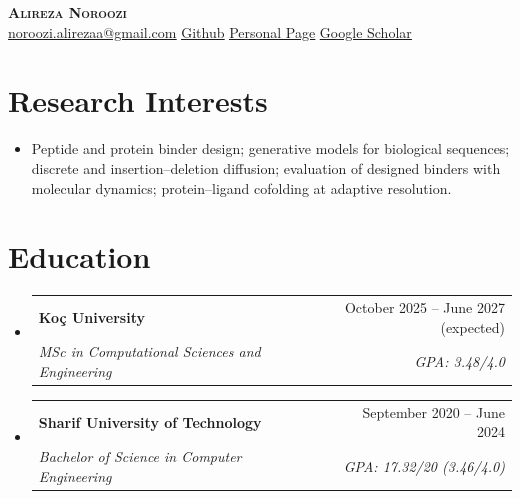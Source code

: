 \documentclass[letterpaper,11pt]{article}
\makeatletter
\newcommand{\resumeItem}[1]{\item\small{#1\vspace{-2pt}}}
\newcommand{\resumeSubheading}[4]{
  \vspace{-2pt}\item
    \begin{tabular*}{0.97\textwidth}[t]{l@{\extracolsep{\fill}}r}
      \textbf{#1} & #2 \\
      \textit{\small#3} & \textit{\small #4} \\
    \end{tabular*}\vspace{-7pt}
}
\newcommand{\resumeSubHeadingListStart}{\begin{itemize}[leftmargin=0.15in, label={}]}
\newcommand{\resumeSubHeadingListEnd}{\end{itemize}}
\newcommand{\resumeItemListStart}{\begin{itemize}}
\newcommand{\resumeItemListEnd}{\end{itemize}\vspace{-5pt}}
\makeatother
\begin{document}
\vspace*{12pt}
\begin{center}
    \textbf{\Huge \scshape Alireza Noroozi \\ \vspace{8pt}}
    \href{mailto:noroozi.alirezaa@gmail.com}{\underline{noroozi.alirezaa@gmail.com}}
    \href{https://github.com/Alirzeanoroozi}{\underline{Github}}
    \href{https://alirzeanoroozi.github.io/}{\underline{Personal Page}}
    \href{https://scholar.google.com/citations?user=CzouC0IAAAAJ\&hl=en}{\underline{Google Scholar}}
\end{center}

\section{Research Interests}
    \resumeItemListStart
        \resumeItem{Peptide and protein binder design; generative models for biological sequences; discrete and insertion--deletion diffusion; evaluation of designed binders with molecular dynamics; protein--ligand cofolding at adaptive resolution.}
    \resumeItemListEnd

\section{Education}
  \resumeSubHeadingListStart
    \resumeSubheading
      {Ko\c{c} University}{October 2025 -- June 2027 (expected)}
      {MSc in Computational Sciences and Engineering}{GPA: 3.48/4.0}
    \resumeSubheading
      {Sharif University of Technology}{September 2020 -- June 2024}
      {Bachelor of Science in Computer Engineering}{GPA: 17.32/20 (3.46/4.0)}
  \resumeSubHeadingListEnd
\end{document}
